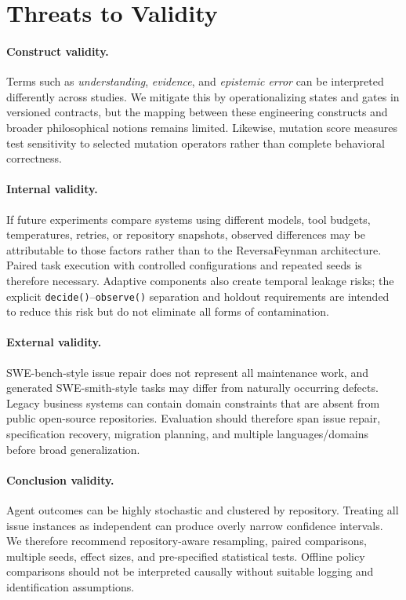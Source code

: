 \section{Threats to Validity}

\paragraph{Construct validity.}
Terms such as \emph{understanding}, \emph{evidence}, and \emph{epistemic error} can be interpreted differently across studies. We mitigate this by operationalizing states and gates in versioned contracts, but the mapping between these engineering constructs and broader philosophical notions remains limited. Likewise, mutation score measures test sensitivity to selected mutation operators rather than complete behavioral correctness.

\paragraph{Internal validity.}
If future experiments compare systems using different models, tool budgets, temperatures, retries, or repository snapshots, observed differences may be attributable to those factors rather than to the ReversaFeynman architecture. Paired task execution with controlled configurations and repeated seeds is therefore necessary. Adaptive components also create temporal leakage risks; the explicit \texttt{decide()}--\texttt{observe()} separation and holdout requirements are intended to reduce this risk but do not eliminate all forms of contamination.

\paragraph{External validity.}
SWE-bench-style issue repair does not represent all maintenance work, and generated SWE-smith-style tasks may differ from naturally occurring defects. Legacy business systems can contain domain constraints that are absent from public open-source repositories. Evaluation should therefore span issue repair, specification recovery, migration planning, and multiple languages/domains before broad generalization.

\paragraph{Conclusion validity.}
Agent outcomes can be highly stochastic and clustered by repository. Treating all issue instances as independent can produce overly narrow confidence intervals. We therefore recommend repository-aware resampling, paired comparisons, multiple seeds, effect sizes, and pre-specified statistical tests. Offline policy comparisons should not be interpreted causally without suitable logging and identification assumptions.

